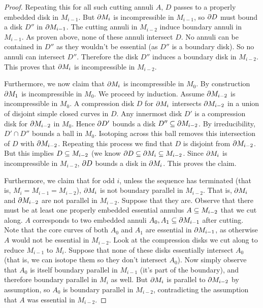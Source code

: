 \begin{proof}
Repeating this for all such cutting annuli $A$, $D$ passes to a properly
embedded disk in $M_{i-1}$. But $\partial M_i$ is incompressible in $M_{i-1}$, so
$\partial D$ must bound a disk $D''$ in $\partial M_{i-1}$. The cutting annuli in
$M_{i-2}$ induce boundary annuli in $M_{i-1}$. As proven above, none of these
annuli intersect $D$.  No annuli can be contained in $D''$ as they wouldn't be
essential (as $D''$ is a boundary disk). So no annuli can intersect $D''$.
Therefore the disk $D''$ induces a boundary disk in $M_{i-2}$. This proves that
$\partial M_i$ is incompressible in $M_{i-2}$.

Furthermore, we now claim that $\partial M_i$ is incompressible in $M_0$. By
construction $\partial M_1$ is incompressible in $M_0$. We proceed by induction.
Assume $\partial M_{i-2}$ is incompressible in $M_0$. A compression disk $D$ for
$\partial M_i$ intersects $\partial M_{i-2}$ in a union of disjoint simple closed curves
in $D$. Any innermost disk $D'$ is a compression disk for $\partial M_{i-2}$ in
$M_0$. Hence $\partial D'$ bounds a disk $D'' \subseteq \partial M_{i-2}$. By irreducibility,
$D' \cap D''$ bounds a ball in $M_0$. Isotoping across this ball removes this
intersection of $D$ with $\partial M_{i-2}$. Repeating this process we find that $D$
is disjoint from $\partial M_{i-2}$. But this implies $D \subseteq M_{i-2}$ (we know $\partial
D \subseteq \partial M_i \subseteq M_{i-2}$. Since $\partial M_i$ is incompressible in $M_{i-2}$,
$\partial D$ bounds a disk in $\partial M_i$. This proves the claim.

Furthermore, we claim that for odd $i$, unless the sequence has terminated
(that is, $M_i=M_{i-1}=M_{i-2}$), $\partial M_i$ is not boundary parallel in
$M_{i-2}$.  That is, $\partial M_i$ and $\partial M_{i-2}$ are not parallel in $M_{i-2}$.
Suppose that they are.  Observe that there must be at least one properly
embedded essential annulus $A \subseteq M_{i-2}$ that we cut along. $A$ corresponds
to two embedded annuli $A_0, A_1 \subseteq \partial M_{i-1}$ after cutting.  Note that
the core curves of both $A_0$ and $A_1$ are essential in $\partial M_{i-1}$, as
otherwise $A$ would not be essential in $M_{i-2}$.  Look at the compression
disks we cut along to reduce $M_{i-1}$ to $M_i$.  Suppose that none of these
disks essentially intersect $A_0$ (that is, we can isotope them so they don't
intersect $A_0$). Now simply observe that $A_0$ is itself boundary parallel in
$M_{i-1}$ (it's part of the boundary), and therefore boundary parallel in $M_i$
as well. But $\partial M_i$ is parallel to $\partial M_{i-2}$ by assumption, so $A_0$ is
boundary parallel in $M_{i-2}$, contradicting the assumption that $A$ was
essential in $M_{i-2}$.


\end{proof}
